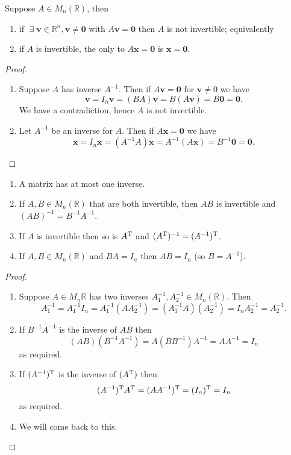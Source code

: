 \begin{proposition}
    Suppose $A\in M_n(\mathbb R)$, then
    \begin{enumerate}
        \item if $\;\exists\;\bm v\in\mathbb R^n,\bm v\neq\bm 0$ with $A\bm v=\bm 0$ then $A$ is not invertible; equivalently
        \item if $A$ is invertible, the only to $A\bm x=\bm 0$ is $\bm x=\bm 0$.
    \end{enumerate}
\end{proposition}

\begin{proof}
    \begin{enumerate}
        \item Suppose $A$ has inverse $A^{-1}$. Then if $A\bm v=\bm 0$ for $\bm v\neq 0$ we have \[\bm v=I_n\bm v=(BA)\bm v=B(A\bm v)=B\bm 0=\bm 0.\] We have a contradiction, hence $A$ is not invertible.
        
        \item Let $A^{-1}$ be an inverse for $A$. Then if $A\bm x=\bm 0$ we have \[\bm x=I_n\bm x=(A^{-1}A)\bm x=A^{-1}(A\bm x)=B^{-1}\bm 0=\bm 0.\]
    \end{enumerate}
\end{proof}

\begin{proposition}
    \begin{enumerate}
        \item A matrix has at most one inverse.
        \item If $A,B\in M_n(\mathbb R)$ that are both invertible, then $AB$ is invertible and $(AB)^{-1}=B^{-1}A^{-1}$.
        \item If $A$ is invertible then so is $A^{\rm T}$ and $(A^{\rm T})^{-1}=(A^{-1})^{\rm T}$.
        \item If $A,B\in M_n(\mathbb R)$ and $BA=I_n$ then $AB=I_n$ (so $B=A^{-1}$).
    \end{enumerate}
\end{proposition}

\begin{proof}
    \begin{enumerate}
        \item Suppose $A\in M_n{\mathbb R}$ has two inverses $A_1^{-1},A_2^{-1}\in M_n(\mathbb R)$. Then \[A_1^{-1}=A_1^{-1}I_n=A_1^{-1}(AA_2^{-1})=(A_1^{-1}A)(A_2^{-1})=I_nA_2^{-1}=A_2^{-1}.\]
        
        \item If $B^{-1}A^{-1}$ is the inverse of $AB$ then \[(AB)(B^{-1}A^{-1})=A(BB^{-1})A^{-1}=AA^{-1}=I_n\] as required.
        
        \item If $(A^{-1})^{\rm T}$ is the inverse of $(A^{\rm T})$ then \[(A^{-1})^{\rm T}A^{\rm T}=(AA^{-1})^{\rm T}=(I_n)^{\rm T}=I_n\] as required.
        
        \item We will come back to this.
    \end{enumerate}
\end{proof}


